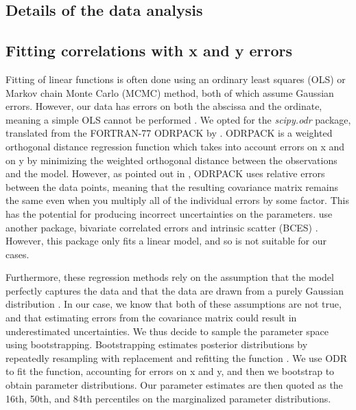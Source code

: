 \begin{subappendices}

\section{Details of the data analysis}

\subsection{Fitting correlations with x and y errors}
\label{P2:app:fitting}

Fitting of linear functions is often done using an ordinary least squares (OLS) or Markov chain Monte Carlo (MCMC) method, both of which assume Gaussian errors. However, our data has errors on both the abscissa and the ordinate, meaning a simple OLS cannot be performed \citep{Hogg2010}. We opted for the \textit{scipy.odr} package, translated from the FORTRAN-77 ODRPACK by \citet{Boggs1989}. ODRPACK is a weighted orthogonal distance regression function which takes into account errors on x and on y by minimizing the weighted orthogonal distance between the observations and the model. However, as pointed out in \citet{Beatty2019}, ODRPACK uses relative errors between the data points, meaning that the resulting covariance matrix remains the same even when you multiply all of the individual errors by some factor. This has the potential for producing incorrect uncertainties on the parameters. \citet{Beatty2019}  use another package, bivariate correlated errors and intrinsic scatter (BCES) \citep{Akritas1996, Nemmen2012}. However, this package only fits a linear model, and so is not suitable for our cases.

Furthermore, these regression methods rely on the assumption that the model perfectly captures the data and that the data are drawn from a purely Gaussian distribution \citep[e.g.,][]{Galton1886, Zhang2004}. In our case, we know that both of these assumptions are not true, and that estimating errors from the covariance matrix could result in underestimated uncertainties. We thus decide to sample the parameter space using bootstrapping. Bootstrapping estimates posterior distributions by repeatedly resampling with replacement and refitting the function \citep{Efron1993}. We use ODR to fit the function, accounting for errors on x and y, and then we bootstrap to obtain parameter distributions. Our parameter estimates are then quoted as the 16th, 50th, and 84th percentiles on the marginalized parameter distributions.


\end{subappendices}
